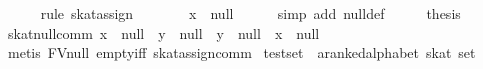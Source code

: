 \begin{isabellebody}
\ \ \ \ \isamarkupfalse%
\ {}rule\ skat{}assign{}{}\isanewline
\ \ \isamarkupfalse%
\ \isamarkupfalse%
\ {}{}{}{}\ {}\ x\ {}{}\ null{}\isanewline
\ \ \ \ \isamarkupfalse%
\ {}simp\ add{}\ null{}def{}\isanewline
\ \ \isamarkupfalse%
\ \isamarkupfalse%
\ {}thesis\ \isamarkupfalse%
\isanewline
{}\isamarkupfalse%
%
\endisatagproof
{\isafoldproof}%
%
\isadelimproof
\isanewline
%
\endisadelimproof
\isanewline
{}\isamarkupfalse%
\ skat{}null{}comm{}\ {}{}x\ {}{}\ null\ {}\ y\ {}{}\ null{}\ {}\ {}y\ {}{}\ null\ {}\ x\ {}{}\ null{}{}\isanewline
%
\isadelimproof
\ \ %
\endisadelimproof
%
\isatagproof
{}\isamarkupfalse%
\ {}metis\ FV{}null\ empty{}iff\ skat{}assign{}comm{}%
\endisatagproof
{\isafoldproof}%
%
\isadelimproof
%
\endisadelimproof
%
\isamarkuptrue%
\isamarkupfalse%
\ test{}set\ {}{}\ {}{}a{}{}ranked{}alphabet\ skat\ set{}\ \isanewline

\end{isabellebody}
